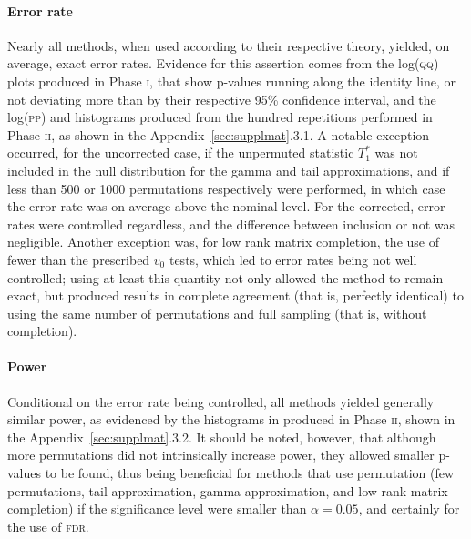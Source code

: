 \paragraph{Error rate} Nearly all methods, when used according to their respective theory, yielded, on average, exact error rates. Evidence for this assertion comes from the log(\textsc{qq}) plots produced in Phase \textsc{i}, that show p-values running along the identity line, or not deviating more than by their respective 95\% confidence interval, and the log(\textsc{pp}) and histograms produced from the hundred repetitions performed in Phase \textsc{ii}, as shown in the Appendix~\ref{sec:supplmat}.3.1. A notable exception occurred, for the uncorrected case, if the unpermuted statistic $T^*_1$ was not included in the null distribution for the gamma and tail approximations, and if less than 500 or 1000 permutations respectively were performed, in which case the error rate was on average above the nominal level. For the corrected, error rates were controlled regardless, and the difference between inclusion or not was negligible. Another exception was, for low rank matrix completion, the use of fewer than the prescribed $v_0$ tests, which led to error rates being not well controlled; using at least this quantity not only allowed the method to remain exact, but produced results in complete agreement (that is, perfectly identical) to using the same number of permutations and full sampling (that is, without completion).

\paragraph{Power} Conditional on the error rate being controlled, all methods yielded generally similar power, as evidenced by the histograms in produced in Phase \textsc{ii}, shown in the Appendix~\ref{sec:supplmat}.3.2. It should be noted, however, that although more permutations did not intrinsically increase power, they allowed smaller p-values to be found, thus being beneficial for methods that use permutation (few permutations, tail approximation, gamma approximation, and low rank matrix completion) if the significance level were smaller than $\alpha = 0.05$, and certainly for the use of \textsc{fdr}.

